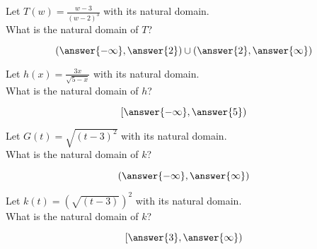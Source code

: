 \documentclass{ximera}
\author{Lee Wayand}
\begin{document}
\begin{exercise}








\begin{question}


Let $T(w) = \frac{w-3}{(w-2)^3}$ with its natural domain. \\

What is the natural domain of $T$?

\[
\left( \answer{-\infty}, \answer{2} \right) \cup \left( \answer{2}, \answer{\infty}  \right)
\]


\end{question}







\begin{question}


Let $h(x) = \frac{3x}{\sqrt{5-x}}$ with its natural domain. \\

What is the natural domain of $h$?

\[
\left[ \answer{-\infty}, \answer{5}  \right)
\]


\end{question}








\begin{question}


Let $G(t) = \sqrt{(t - 3)^2}$ with its natural domain. \\

What is the natural domain of $k$?

\[
\left( \answer{-\infty}, \answer{\infty}  \right)
\]


\end{question}













\begin{question}


Let $k(t) = \left( \sqrt{(t - 3)} \right)^2$ with its natural domain. \\

What is the natural domain of $k$?

\[
\left[ \answer{3}, \answer{\infty}  \right)
\]


\end{question}




















\end{exercise}
\end{document}
